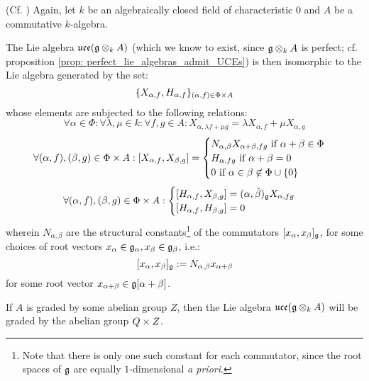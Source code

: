         \begin{theorem} \label{theorem: kassel_presentations_for_UCEs}
            (Cf. \cite[Definition 3.1 and Corollary 3.4]{kassel_universal_central_extensions_of_lie_algebras}) Again, let $k$ be an algebraically closed field of characteristic $0$ and $A$ be a commutative $k$-algebra. 

            The Lie algebra $\uce(\g \tensor_k A)$ (which we know to exist, since $\g \tensor_k A$ is perfect; cf. proposition \ref{prop: perfect_lie_algebras_admit_UCEs}) is then isomorphic to the Lie algebra generated by the set:
                $$\{ X_{\alpha, f}, H_{\alpha, f} \}_{(\alpha, f) \in \Phi \x A}$$
            whose elements are subjected to the following relations:
                $$\forall \alpha \in \Phi: \forall \lambda, \mu \in k: \forall f, g \in A: X_{\alpha, \lambda f + \mu g} = \lambda X_{\alpha, f} + \mu X_{\alpha, g}$$
                $$
                    \forall (\alpha, f), (\beta, g) \in \Phi \x A: [X_{\alpha, f}, X_{\beta, g}] =
                    \begin{cases}
                        \text{$N_{\alpha, \beta} X_{\alpha + \beta, fg}$ if $\alpha + \beta \in \Phi$}
                        \\
                        \text{$H_{\alpha, fg}$ if $\alpha + \beta = 0$}
                        \\
                        \text{$0$ if $\alpha \in \beta \not \in \Phi \cup \{0\}$}
                    \end{cases}
                $$
                $$
                    \forall (\alpha, f), (\beta, g) \in \Phi \x A:
                    \begin{cases}
                        [H_{\alpha, f}, X_{\beta, g}] = (\alpha, \check{\beta})_{\g} X_{\alpha, fg}
                        \\
                        [H_{\alpha, f}, H_{\beta, g}] = 0
                    \end{cases}    
                $$
            wherein $N_{\alpha, \beta}$ are the structural constants\footnote{Note that there is only one such constant for each commutator, since the root spaces of $\mathfrak{g}$ are equally $1$-dimensional \textit{a priori}.} of the commutators $[x_{\alpha}, x_{\beta}]_{\mathfrak{g}}$, for some choices of root vectors $x_{\alpha} \in \mathfrak{g}_{\alpha}, x_{\beta} \in \mathfrak{g}_{\beta}$, i.e.:
                $$[x_{\alpha}, x_{\beta}]_{\mathfrak{g}} := N_{\alpha, \beta} x_{\alpha + \beta}$$
            for some root vector $x_{\alpha + \beta} \in \mathfrak{g}[\alpha + \beta]$.
        \end{theorem}
        \begin{corollary}
            If $A$ is graded by some abelian group $Z$, then the Lie algebra $\uce(\g \tensor_k A)$ will be graded by the abelian group $Q \x Z$. 
        \end{corollary}

